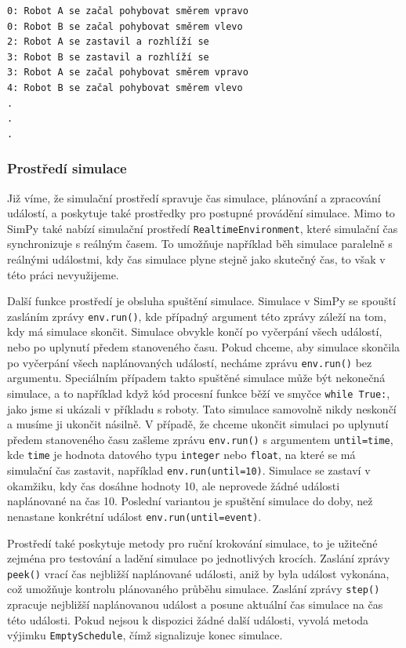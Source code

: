 \documentclass[
  program=itp,
  biblatex,
  figures=false,
  glossaries,
  index
]{kidiplom}
\begin{document}
 \begin{verbatim} 
0: Robot A se začal pohybovat směrem vpravo
0: Robot B se začal pohybovat směrem vlevo
2: Robot A se zastavil a rozhlíží se
3: Robot B se zastavil a rozhlíží se
3: Robot A se začal pohybovat směrem vpravo
4: Robot B se začal pohybovat směrem vlevo
.
.
.
\end{verbatim}

\subsubsection{Prostředí simulace}
Již víme, že simulační prostředí spravuje čas simulace, plánování a zpracování událostí, a poskytuje také prostředky pro postupné provádění simulace. Mimo to SimPy také nabízí simulační prostředí \texttt{RealtimeEnvironment}, které simulační čas synchronizuje s reálným časem. To umožňuje například běh simulace paralelně s reálnými událostmi, kdy čas simulace plyne stejně jako skutečný čas, to však v této práci nevyužijeme.

Další funkce prostředí je obsluha spuštění simulace. Simulace v SimPy se spouští zasláním zprávy \texttt{env.run()}, kde případný argument této zprávy záleží na tom, kdy má simulace skončit. Simulace obvykle končí po vyčerpání všech událostí, nebo po uplynutí předem stanoveného času. Pokud chceme, aby simulace skončila po vyčerpání všech naplánovaných událostí, necháme zprávu \texttt{env.run()} bez argumentu. Speciálním případem takto spuštěné simulace může být nekonečná simulace, a to například když kód procesní funkce běží ve smyčce \texttt{while True:}, jako jsme si ukázali v příkladu s roboty. Tato simulace samovolně nikdy neskončí a musíme ji ukončit násilně.
V případě, že chceme ukončit simulaci po uplynutí předem stanoveného času zašleme zprávu \texttt{env.run()} s argumentem \texttt{until=time}, kde \texttt{time} je hodnota datového typu \texttt{integer} nebo \texttt{float}, na které se má simulační čas zastavit, například \texttt{env.run(until=10)}. Simulace se zastaví v okamžiku, kdy čas dosáhne hodnoty 10, ale neprovede žádné události naplánované na čas 10. Poslední variantou je spuštění simulace do doby, než nenastane konkrétní událost \texttt{env.run(until=event)}. 

Prostředí také poskytuje metody pro ruční krokování simulace, to je užitečné zejména pro testování a ladění simulace po jednotlivých krocích. Zaslání zprávy \texttt{peek()} vrací čas nejbližší naplánované události, aniž by byla událost vykonána, což umožňuje kontrolu plánovaného průběhu simulace. Zaslání zprávy \texttt{step()} zpracuje nejbližší naplánovanou událost a posune aktuální čas simulace na čas této události. Pokud nejsou k dispozici žádné další události, vyvolá metoda výjimku \texttt{EmptySchedule}, čímž signalizuje konec simulace. 
\end{document}
